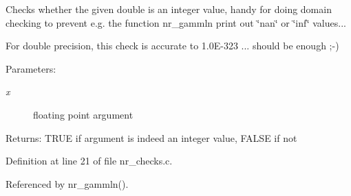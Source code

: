 Checks whether the given double is an integer value, handy for doing domain checking to prevent e.g. the function nr\_\-gammln print out \char`\"{}nan\char`\"{} or \char`\"{}inf\char`\"{} values...

For double precision, this check is accurate to 1.0E-323 ... should be enough ;-)

\begin{Desc}
\item[Parameters:]
\begin{description}
\item[{\em x}]floating point argument\end{description}
\end{Desc}
\begin{Desc}
\item[Returns:]TRUE if argument is indeed an integer value, FALSE if not \end{Desc}


Definition at line 21 of file nr\_\-checks.c.

Referenced by nr\_\-gammln().